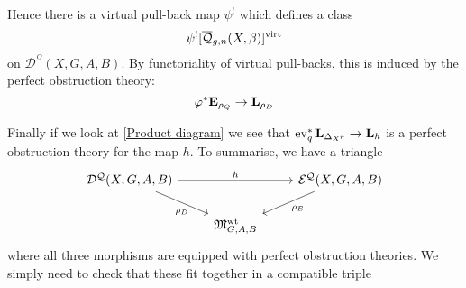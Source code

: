 Hence there is a virtual pull-back map $\psi^!$ which defines a class
\begin{equation*}\psi^! [\overline{\mathcal Q}_{g,n}(X,\beta)]^{\operatorname{virt}} \end{equation*}
on $\mathcal{D}^{\mathcal{Q}}(X,G,A,B)$. By functoriality of virtual pull-backs, this is induced by the perfect obstruction theory:
\begin{equation*} \varphi^* \mathbf{E}_{\rho_Q} \rightarrow \mathbf{L}_{\rho_D} \end{equation*}

Finally if we look at \eqref{Product diagram} we see that $\operatorname{ev}_q^* \mathbf{L}_{\Delta_{X^r}} \rightarrow \mathbf{L}_h$ is a perfect obstruction theory for the map $h$. To summarise, we have a triangle
\begin{equation}\label{D-E-triangle}
 \begin{tikzcd}
  \D{X}{G,A}{B} \ar[dr,"\rho_D" below=0.1cm] \ar[rr,"h"] & & \E{X}{G,A}{B}\ar[dl,"\rho_E"] \\
& \MM_{G,A,B}^{\operatorname{wt}} &
 \end{tikzcd}
\end{equation}
where all three morphisms are equipped with perfect obstruction theories. We simply need to check that these fit together in a compatible triple

